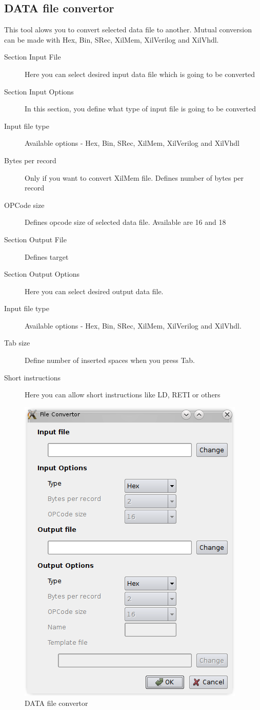 \subsection{DATA file convertor}
    This tool alows you to convert selected data file to another. Mutual conversion can be made with Hex, Bin, SRec, XilMem, XilVerilog and XilVhdl.
    \begin{description}
        \item[Section Input File] Here you can select desired input data file which is going to be converted
        \item[Section Input Options] In this section, you define what type of input file is going to be converted
        \item[Input file type] Available options - Hex, Bin, SRec, XilMem, XilVerilog and XilVhdl
        \item[Bytes per record] Only if you want to convert XilMem file. Defines number of bytes per record
        \item[OPCode size] Defines opcode size of selected data file. Available are 16 and 18
        \item[Section Output File] Defines target
        \item[Section Output Options] Here you can select desired output data file.
        \item[Input file type] Available options - Hex, Bin, SRec, XilMem, XilVerilog and XilVhdl.
        \item[Tab size]  Define number of inserted spaces when you press Tab.
        \item[Short instructions] Here you can allow short instructions like LD, RETI or others
    \end{description}

    \begin{figure}[h]
        \centering{}
        \includegraphics[width=.5\textwidth]{img/DATA_convertor.png}
        \caption{DATA file convertor}
    \end{figure}

